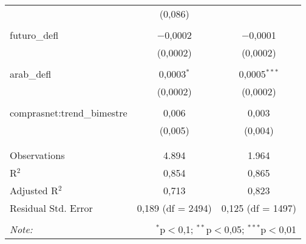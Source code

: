 \begin{table}[!htbp]
\begin{tabular}{@{\extracolsep{5pt}}lcc}
  & (0,086) &  \\ 
  & & \\ 
 futuro\_defl & $-$0,0002 & $-$0,0001 \\ 
  & (0,0002) & (0,0002) \\ 
  & & \\ 
 arab\_defl & 0,0003$^{*}$ & 0,0005$^{***}$ \\ 
  & (0,0002) & (0,0002) \\ 
  & & \\ 
 comprasnet:trend\_bimestre & 0,006 & 0,003 \\ 
  & (0,005) & (0,004) \\ 
  & & \\ 
\hline \\[-1.8ex] 
Observations & 4.894 & 1.964 \\ 
R$^{2}$ & 0,854 & 0,865 \\ 
Adjusted R$^{2}$ & 0,713 & 0,823 \\ 
Residual Std. Error & 0,189 (df = 2494) & 0,125 (df = 1497) \\ 
\hline 
\hline \\[-1.8ex] 
\textit{Note:}  & \multicolumn{2}{r}{$^{*}$p$<$0,1; $^{**}$p$<$0,05; $^{***}$p$<$0,01} \\ 
\end{tabular} 
\end{table} 
